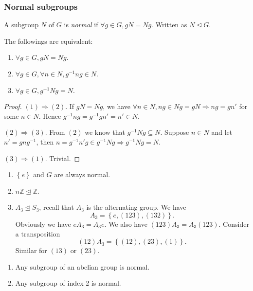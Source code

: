 \documentclass[a4paper]{article}
\begin{document}
    \subsubsection{Normal subgroups}
    \begin{definition}
        A subgroup $N$ of $G$ is \textit{normal} if $ \forall g\in G, gN=Ng $. Written as $ N \trianglelefteq G $.
    \end{definition}
    \begin{proposition}\label{prop:condition for normal groups}
        The followings are equivalent:
        \begin{enumerate}[(1)]
            \item $ \forall g\in G, gN=Ng $.
            \item $ \forall g\in G, \forall n\in N, g^{-1}ng\in N $.
            \item $ \forall g\in G, g^{-1}Ng=N $.
        \end{enumerate}
    \end{proposition}
    \begin{proof}
        $ (1)\Rightarrow (2) $. If $ gN=Ng $, we have $ \forall n\in N, ng\in Ng=gN \Rightarrow ng=gn' $ for some $n\in N$. Hence $ g^{-1}ng=g^{-1}gn'=n'\in N $.

        $ (2) \Rightarrow (3) $. From $(2)$ we know that $ g^{-1}Ng \subseteq N $. Suppose $ n\in N $ and let $ n'=gng^{-1} $, then $ n=g^{-1}n'g\in g^{-1}Ng \Rightarrow g^{-1}Ng = N $.

        $ (3) \Rightarrow (1) $. Trivial.
    \end{proof}
    \begin{example}
        \begin{enumerate}[(1)]
            \item $ \left\{ e\right\} $ and $G$ are always normal.
            \item $ n \mathbb{Z}\trianglelefteq \mathbb{Z}$.
            \item $ A_3 \trianglelefteq S_3 $, recall that $ A_3 $ is the alternating group. We have
            \[
                A_3=\left\{ e,(123),(132)\right\}
            .\]
            Obviously we have $ eA_3=A_3e $. We also have $(123)A_3=A_3(123)$. Consider a transposition
            \[
                (12)A_3=\left\{(12),(23),(1) \right\}
            .\]
            Similar for $(13)$ or $(23)$.
        \end{enumerate}
    \end{example}
    \begin{proposition}
        \begin{enumerate}[(1)]
            \item Any subgroup of an abelian group is normal.
            \item Any subgroup of index 2 is normal.
        \end{enumerate}
    \end{proposition}
\end{document}
